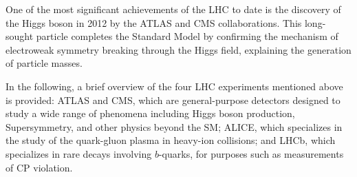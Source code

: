 One of the most significant achievements of the LHC to date is the discovery of the Higgs boson in 2012 by the ATLAS and CMS collaborations. This long-sought particle completes the Standard Model by confirming the mechanism of electroweak symmetry breaking through the Higgs field, explaining the generation of particle masses.

In the following, a brief overview of the four LHC experiments mentioned above is provided: ATLAS and CMS, which are general-purpose detectors designed to study a wide range of phenomena including Higgs boson production, Supersymmetry, and other physics beyond the SM; ALICE, which specializes in the study of the quark-gluon plasma in heavy-ion collisions; and LHCb, which specializes in rare decays involving $b$-quarks, for purposes such as measurements of CP violation.
